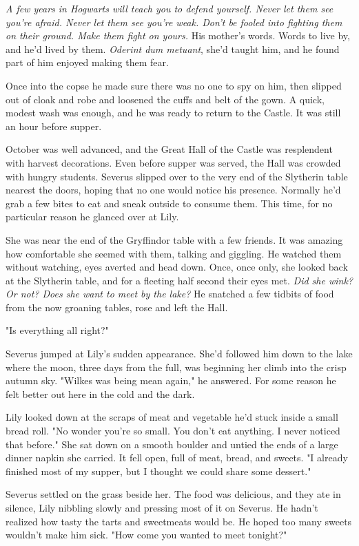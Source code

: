 \documentclass[a4paper,11pt]{article}
\begin{document}
\emph{A few years in Hogwarts will teach you to defend yourself. Never let them see you're afraid. Never let them see you're weak. Don't be fooled into fighting them on their ground. Make them fight on yours.} His mother's words. Words to live by, and he'd lived by them. \emph{Oderint dum metuant}, she'd taught him, and he found part of him enjoyed making them fear.

Once into the copse he made sure there was no one to spy on him, then slipped out of cloak and robe and loosened the cuffs and belt of the gown. A quick, modest wash was enough, and he was ready to return to the Castle. It was still an hour before supper.

October was well advanced, and the Great Hall of the Castle was resplendent with harvest decorations. Even before supper was served, the Hall was crowded with hungry students. Severus slipped over to the very end of the Slytherin table nearest the doors, hoping that no one would notice his presence. Normally he'd grab a few bites to eat and sneak outside to consume them. This time, for no particular reason he glanced over at Lily.

She was near the end of the Gryffindor table with a few friends. It was amazing how comfortable she seemed with them, talking and giggling. He watched them without watching, eyes averted and head down. Once, once only, she looked back at the Slytherin table, and for a fleeting half second their eyes met. \emph{Did she wink? Or not? Does she want to meet by the lake?} He snatched a few tidbits of food from the now groaning tables, rose and left the Hall.

"Is everything all right?"

Severus jumped at Lily's sudden appearance. She'd followed him down to the lake where the moon, three days from the full, was beginning her climb into the crisp autumn sky. "Wilkes was being mean again," he answered. For some reason he felt better out here in the cold and the dark.

Lily looked down at the scraps of meat and vegetable he'd stuck inside a small bread roll. "No wonder you're so small. You don't eat anything. I never noticed that before." She sat down on a smooth boulder and untied the ends of a large dinner napkin she carried. It fell open, full of meat, bread, and sweets. "I already finished most of my supper, but I thought we could share some dessert."

Severus settled on the grass beside her. The food was delicious, and they ate in silence, Lily nibbling slowly and pressing most of it on Severus. He hadn't realized how tasty the tarts and sweetmeats would be. He hoped too many sweets wouldn't make him sick. "How come you wanted to meet tonight?"
\end{document}
